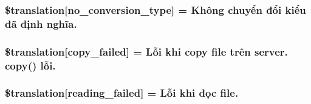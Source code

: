 \subsubsection[{\$translation}]{\setlength{\rightskip}{0pt plus 5cm}\$translation\mbox{[}\textquotesingle{}no\+\_\+conversion\+\_\+type\textquotesingle{}\mbox{]} = \textquotesingle{}Không chuyển đổi kiểu đã định nghĩa.\textquotesingle{}}\label{class_8upload_8vn___v_n_8php_a4712d7ec28e9a7f17eb3338af2358363}
\hypertarget{class_8upload_8vn___v_n_8php_a783c9358bcf54a054545b50098bc679b}{}
\subsubsection[{\$translation}]{\setlength{\rightskip}{0pt plus 5cm}\$translation\mbox{[}\textquotesingle{}copy\+\_\+failed\textquotesingle{}\mbox{]} = \textquotesingle{}Lỗi khi copy file trên server. copy() lỗi.\textquotesingle{}}\label{class_8upload_8vn___v_n_8php_a783c9358bcf54a054545b50098bc679b}
\hypertarget{class_8upload_8vn___v_n_8php_a01bea14c9fd5f353f62db44beabfcd42}{}
\subsubsection[{\$translation}]{\setlength{\rightskip}{0pt plus 5cm}\$translation\mbox{[}\textquotesingle{}reading\+\_\+failed\textquotesingle{}\mbox{]} = \textquotesingle{}Lỗi khi đọc file.\textquotesingle{}}\label{class_8upload_8vn___v_n_8php_a01bea14c9fd5f353f62db44beabfcd42}
